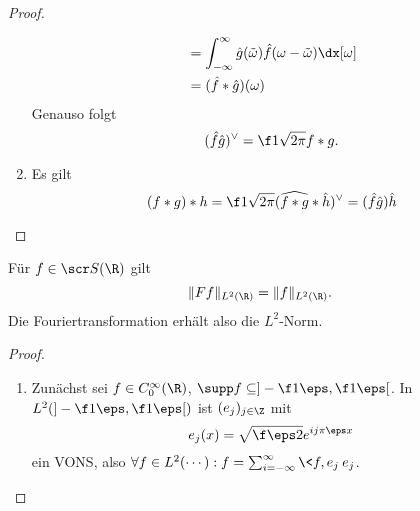 \begin{st}
\begin{proof}
\begin{enumerate}[1)]
\begin{align*}
					&= \int_{-\infty}^\infty \hat g(\tilde \omega)\hat f(\omega - \tilde \omega) \dx[\omega] \\
					&= (\hat f \ast \hat g)(\omega)
				\end{align*}
				Genauso folgt
				\[
					(\hat f \hat g)^\vee = \f 1{\sqrt{2\pi}} f \ast g.
				\]
			\item
				Es gilt
				\[
					(f\ast g) \ast h = \f 1{\sqrt{2\pi}} (\widehat {f \ast g}  \ast \hat h)^\vee = (\hat f \hat g) \hat h
				\]
		\end{enumerate}
	\end{proof}
\end{st}

\begin{st} \label{4.15}
	Für $f \in \scr S(\R)$ gilt
	\[
		\|Ff\|_{L^2(\R)} = \|f\|_{L^2(\R)}.
	\]
	Die Fouriertransformation erhält also die $L^2$-Norm.
	\begin{proof}
		\begin{enumerate}[1)]
			\item
				Zunächst sei $f \in C_0^\infty(\R)$, $\supp f \subset ]-\f 1\eps, \f 1\eps[$.
				In $L^2(]-\f 1\eps, \f 1\eps[)$ ist $(e_j)_{j\in \Z}$ mit
				\[
					e_j(x) = \sqrt{ \f\eps 2} e^{ij\pi \eps x}
				\]
				ein VONS, also $\forall f \in L^2(\cdots) : f = \sum_{i=-\infty}^\infty \<f,e_j\> e_j$.


\end{enumerate}
\end{proof}
\end{st}
